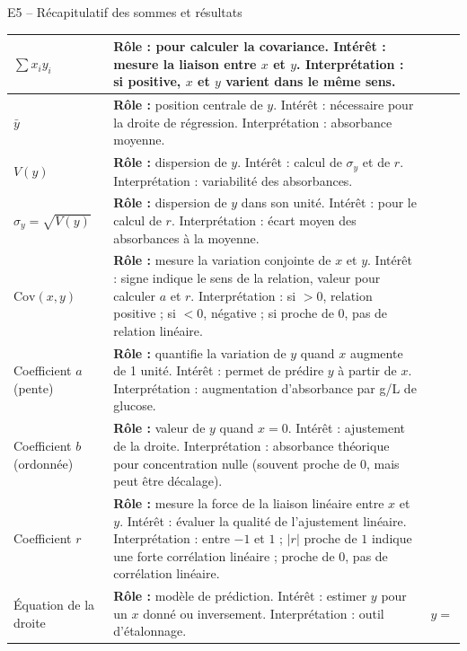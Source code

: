 \documentclass[11pt,a4paper]{article}
\begin{document}
\begin{vignetteMethode}{E5 -- Récapitulatif des sommes et résultats}
\begin{center}
\begin{tabular}{|p{3cm}|p{9cm}|p{3cm}|}
$\sum x_i y_i$ & 
\tiny\textbf{Rôle : } pour calculer la covariance. 
Intérêt : mesure la liaison entre $x$ et $y$. 
Interprétation : si positive, $x$ et $y$ varient dans le même sens. & \\ \hline
$\bar{y}$ & 
\tiny\textbf{Rôle : } position centrale de $y$. 
Intérêt : nécessaire pour la droite de régression. 
Interprétation : absorbance moyenne. & \\ \hline
$V(y)$ & 
\tiny\textbf{Rôle : } dispersion de $y$. 
Intérêt : calcul de $\sigma_y$ et de $r$. 
Interprétation : variabilité des absorbances. & \\ \hline
$\sigma_y = \sqrt{V(y)}$ & 
\tiny\textbf{Rôle : } dispersion de $y$ dans son unité. 
Intérêt : pour le calcul de $r$. 
Interprétation : écart moyen des absorbances à la moyenne. & \\ \hline
$\mathrm{Cov}(x,y)$ & 
\tiny\textbf{Rôle : } mesure la variation conjointe de $x$ et $y$. 
Intérêt : signe indique le sens de la relation, valeur pour calculer $a$ et $r$. 
Interprétation : si $>0$, relation positive ; si $<0$, négative ; si proche de 0, pas de relation linéaire. & \\ \hline
Coefficient $a$ (pente) & 
\tiny\textbf{Rôle : } quantifie la variation de $y$ quand $x$ augmente de 1 unité. 
Intérêt : permet de prédire $y$ à partir de $x$. 
Interprétation : augmentation d'absorbance par g/L de glucose. & \\ \hline
Coefficient $b$ (ordonnée) & 
\tiny\textbf{Rôle : } valeur de $y$ quand $x=0$. 
Intérêt : ajustement de la droite. 
Interprétation : absorbance théorique pour concentration nulle (souvent proche de 0, mais peut être décalage). & \\ \hline
Coefficient $r$ & 
\tiny\textbf{Rôle : } mesure la force de la liaison linéaire entre $x$ et $y$. 
Intérêt : évaluer la qualité de l'ajustement linéaire. 
Interprétation : entre $-1$ et $1$ ; $|r|$ proche de $1$ indique une forte corrélation linéaire ; proche de $0$, pas de corrélation linéaire. & \\ \hline
Équation de la droite & 
\tiny\textbf{Rôle : } modèle de prédiction. 
Intérêt : estimer $y$ pour un $x$ donné ou inversement. 
Interprétation : outil d'étalonnage. & $y = $ \\ \hline
\end{tabular}
\end{center}
\end{vignetteMethode}

\newpage

\end{document}
